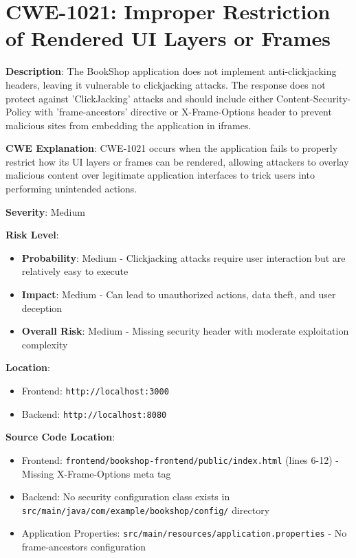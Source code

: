 \documentclass[]{UCD_CS_FYP_Report}
\begin{document}
\section{CWE-1021: Improper Restriction of Rendered UI Layers or Frames}

\textbf{Description}: The BookShop application does not implement anti-clickjacking headers, leaving it vulnerable to clickjacking attacks. The response does not protect against 'ClickJacking' attacks and should include either Content-Security-Policy with 'frame-ancestors' directive or X-Frame-Options header to prevent malicious sites from embedding the application in iframes.

\textbf{CWE Explanation}: CWE-1021 occurs when the application fails to properly restrict how its UI layers or frames can be rendered, allowing attackers to overlay malicious content over legitimate application interfaces to trick users into performing unintended actions.

\textbf{Severity}: Medium

\textbf{Risk Level}: 
\begin{itemize}
    \item \textbf{Probability}: Medium - Clickjacking attacks require user interaction but are relatively easy to execute
    \item \textbf{Impact}: Medium - Can lead to unauthorized actions, data theft, and user deception
    \item \textbf{Overall Risk}: Medium - Missing security header with moderate exploitation complexity
\end{itemize}

\textbf{Location}: 
\begin{itemize}
    \item Frontend: \texttt{http://localhost:3000}
    \item Backend: \texttt{http://localhost:8080}
\end{itemize}

\textbf{Source Code Location}: 
\begin{itemize}
    \item Frontend: \texttt{frontend/bookshop-frontend/public/index.html} (lines 6-12) - Missing X-Frame-Options meta tag
    \item Backend: No security configuration class exists in \texttt{src/main/java/com/example/bookshop/config/} directory
    \item Application Properties: \texttt{src/main/resources/application.properties} - No frame-ancestors configuration
\end{itemize}
\end{document}
